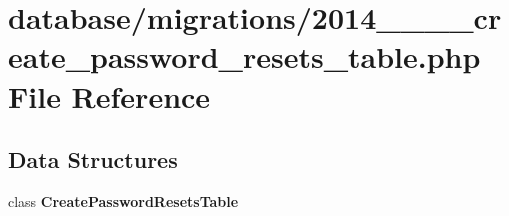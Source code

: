\section{database/migrations/2014\+\_\+\_\+\_\+\_\+create\+\_\+password\+\_\+resets\+\_\+table.php File Reference}
\label{2014__10__12__100000__create__password__resets__table_8php}
\subsection*{Data Structures}
\begin{DoxyCompactItemize}
\item 
class {\bf Create\+Password\+Resets\+Table}
\end{DoxyCompactItemize}
